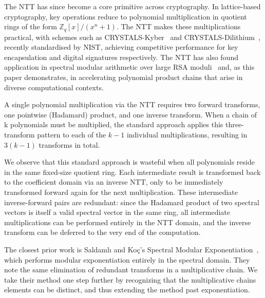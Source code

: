 \documentclass[runningheads]{llncs}
\begin{document}
The NTT has since become a core primitive across cryptography. In lattice-based cryptography, key operations reduce to polynomial multiplication in quotient rings of the form $\mathbb{Z}_q[x]/(x^n+1)$. The NTT makes these multiplications practical, with schemes such as CRYSTALS-Kyber~\cite{bos2018kyber} and CRYSTALS-Dilithium~\cite{ducas2018dilithium}, recently standardised by NIST, achieving competitive performance for key encapsulation and digital signatures respectively. The NTT has also found application in spectral modular arithmetic over large RSA moduli~\cite{saldamli2007spectral} and, as this paper demonstrates, in accelerating polynomial product chains that arise in diverse computational contexts.

A single polynomial multiplication via the NTT requires two forward transforms, one pointwise (Hadamard) product, and one inverse transform. When a
chain of k polynomials must be multiplied, the standard approach applies this three-transform pattern to each of the $k - 1$ individual multiplications, resulting in
$3(k -1)$ transforms in total.

We observe that this standard approach is wasteful when all polynomials reside in the same fixed-size quotient ring. Each intermediate result is transformed back to the coefficient domain via an inverse NTT, only to be immediately transformed forward again for the next multiplication. These intermediate inverse-forward pairs are redundant: since the Hadamard product of two spectral vectors is itself a valid spectral vector in the same ring, all intermediate multiplications can be performed entirely in the NTT domain, and the inverse transform can be deferred to the very end of the computation.

The closest prior work is Saldamlı and Koç's Spectral Modular Exponentiation~\cite{saldamli2007spectral}, which performs modular exponentiation entirely in the spectral domain. They note the same elimination of redundant transforms in a multiplicative chain. We take their method one step further by recognizing that the multiplicative chains elements can be distinct, and thus extending the method past exponentiation.
\end{document}
